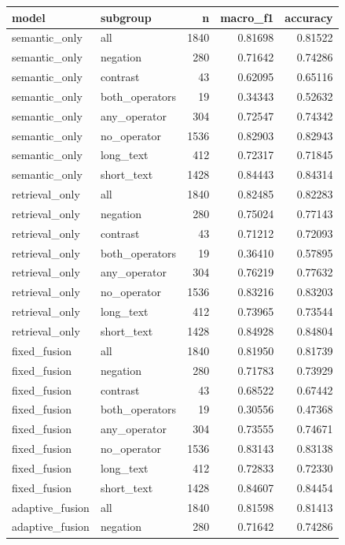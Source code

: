 \begin{tabular}{llrrr}
\toprule
model & subgroup & n & macro_f1 & accuracy \\
\midrule
semantic_only & all & 1840 & 0.81698 & 0.81522 \\
semantic_only & negation & 280 & 0.71642 & 0.74286 \\
semantic_only & contrast & 43 & 0.62095 & 0.65116 \\
semantic_only & both_operators & 19 & 0.34343 & 0.52632 \\
semantic_only & any_operator & 304 & 0.72547 & 0.74342 \\
semantic_only & no_operator & 1536 & 0.82903 & 0.82943 \\
semantic_only & long_text & 412 & 0.72317 & 0.71845 \\
semantic_only & short_text & 1428 & 0.84443 & 0.84314 \\
retrieval_only & all & 1840 & 0.82485 & 0.82283 \\
retrieval_only & negation & 280 & 0.75024 & 0.77143 \\
retrieval_only & contrast & 43 & 0.71212 & 0.72093 \\
retrieval_only & both_operators & 19 & 0.36410 & 0.57895 \\
retrieval_only & any_operator & 304 & 0.76219 & 0.77632 \\
retrieval_only & no_operator & 1536 & 0.83216 & 0.83203 \\
retrieval_only & long_text & 412 & 0.73965 & 0.73544 \\
retrieval_only & short_text & 1428 & 0.84928 & 0.84804 \\
fixed_fusion & all & 1840 & 0.81950 & 0.81739 \\
fixed_fusion & negation & 280 & 0.71783 & 0.73929 \\
fixed_fusion & contrast & 43 & 0.68522 & 0.67442 \\
fixed_fusion & both_operators & 19 & 0.30556 & 0.47368 \\
fixed_fusion & any_operator & 304 & 0.73555 & 0.74671 \\
fixed_fusion & no_operator & 1536 & 0.83143 & 0.83138 \\
fixed_fusion & long_text & 412 & 0.72833 & 0.72330 \\
fixed_fusion & short_text & 1428 & 0.84607 & 0.84454 \\
adaptive_fusion & all & 1840 & 0.81598 & 0.81413 \\
adaptive_fusion & negation & 280 & 0.71642 & 0.74286 \\

\end{tabular}

